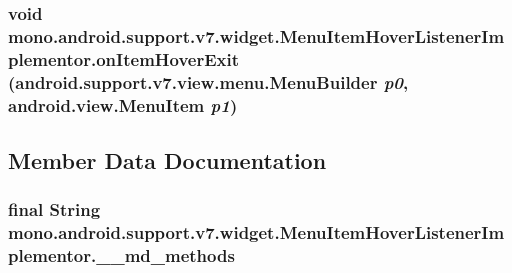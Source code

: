 \hypertarget{classmono_1_1android_1_1support_1_1v7_1_1widget_1_1_menu_item_hover_listener_implementor_76b4f45a652d7bded4b5303f6163098c}{
\subsubsection[{onItemHoverExit}]{\setlength{\rightskip}{0pt plus 5cm}void mono.android.support.v7.widget.MenuItemHoverListenerImplementor.onItemHoverExit (android.support.v7.view.menu.MenuBuilder {\em p0}, \/  android.view.MenuItem {\em p1})}}
\label{classmono_1_1android_1_1support_1_1v7_1_1widget_1_1_menu_item_hover_listener_implementor_76b4f45a652d7bded4b5303f6163098c}




\subsection{Member Data Documentation}
\hypertarget{classmono_1_1android_1_1support_1_1v7_1_1widget_1_1_menu_item_hover_listener_implementor_73a796ddc43d5f81a5967a791026a58b}{
\subsubsection[{\_\-\_\-md\_\-methods}]{\setlength{\rightskip}{0pt plus 5cm}final String {\bf mono.android.support.v7.widget.MenuItemHoverListenerImplementor.\_\-\_\-md\_\-methods}}}
\label{classmono_1_1android_1_1support_1_1v7_1_1widget_1_1_menu_item_hover_listener_implementor_73a796ddc43d5f81a5967a791026a58b}


